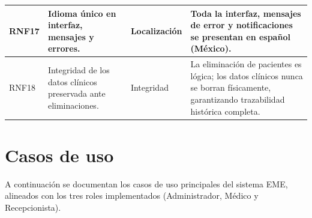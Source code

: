 \documentclass[11pt,a4paper]{article}
\begin{document}
\begin{longtable}{|C{1.2cm}|L{5cm}|L{2.5cm}|L{5cm}|}
    RNF17       & Idioma único en interfaz, mensajes y errores.                                                            & Localización       & Toda la interfaz, mensajes de error y notificaciones se presentan en español (México).                                                                                                                  \\
    \hline

    RNF18       & Integridad de los datos clínicos preservada ante eliminaciones.                                          & Integridad         & La eliminación de pacientes es lógica; los datos clínicos nunca se borran físicamente, garantizando trazabilidad histórica completa.                                                                    \\
    \hline
\end{longtable}

\section{Casos de uso}

A continuación se documentan los casos de uso principales del sistema EME, alineados con los tres roles implementados (Administrador, Médico y Recepcionista).

\end{document}
